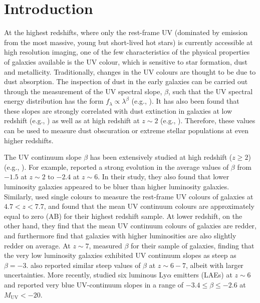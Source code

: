 \documentclass[twocolumn]{aastex63}
\begin{document}


\section{Introduction} \label{sec:intro}
At the highest redshifts, where only the rest-frame UV (dominated by emission from the most massive, young but short-lived hot stars) is currently accessible at high resolution imaging, one of the few characteristics of the physical properties of galaxies available is the UV colour, which is sensitive to star formation, dust and metallicity. Traditionally, changes in the UV colours are thought to be due to dust absorption. The inspection of dust in the early galaxies can be carried out through the measurement of the UV spectral slope, $\beta$, such that the UV spectral energy distribution has the form $f_{\lambda}\propto\lambda^{\beta}$ (e.g., \citealt{Calzetti1994}). It has also been found that these slopes are strongly correlated with dust extinction in galaxies at low redshift (e.g., \citealt{Meurer1995, Meurer1997, Meurer1999}) as well as at high redshift at $z\sim2$ (e.g., \citealt{Daddi2004, Reddy2012}). Therefore, these
values can be used to measure dust obscuration or extreme stellar populations at even higher redshifts.

The UV continuum slope $\beta$ has been extensively studied at high redshift ($z\geq2$) (e.g., \citealt{Bouwens2009, Bouwens2010, Finkelstein2010, Wilkins2011, Bouwens2012, Finkelstein2012, Dunlop2013, Oesch2013b, Rogers2014, Bouwens2014b, Kurczynski2014, Wilkins2016, Jiang2020}). For example, \citet{Bouwens2009} reported a strong evolution in the average values of $\beta$ from $-1.5$ at $z\sim2$ to  $-2.4 $ at $z\sim6$. In their study, they also found that lower luminosity galaxies appeared to be bluer than higher luminosity galaxies. Similarly, \citet{Wilkins2011} used single colours to measure the rest-frame UV colours of galaxies at $4.7<z<7.7$, and found that the mean UV continuum colours are approximately equal to zero (AB) for their highest redshift sample. At lower redshift, on the other hand, they find that the mean UV continuum colours of galaxies are redder, and furthermore find that galaxies with higher luminosities are also slightly redder on average. At $z\sim7$, \citet{Bouwens2010} measured $\beta$ for their sample of galaxies, finding that the very low luminosity galaxies exhibited UV continuum slopes as steep as $\beta=-3$. \citet{Finkelstein2010} also reported similar steep values of $\beta$ at $z\sim6-7$, albeit with larger uncertainties. More recently, \citet{Jiang2020} studied six luminous Ly$\alpha$ emitters (LAEs) at $z\sim6$ and reported very blue UV-continuum slopes in a range of $-3.4\leq\beta\leq-2.6$ at $M_{\mathrm{UV}}<-20$.
\end{document}
